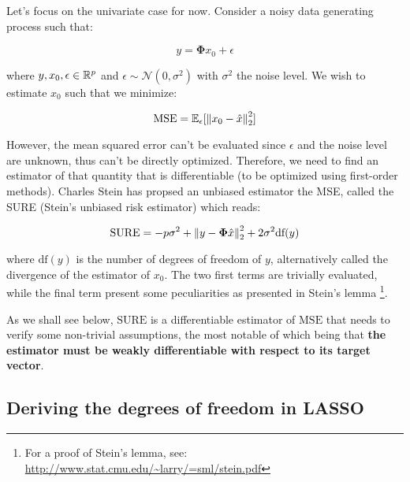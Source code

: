\documentclass[a4paper,10pt]{article}
\theoremstyle{definition}
\begin{document}
Let's focus on the univariate case for now. Consider a noisy data generating process such that:

\begin{equation*}
    y = \mathbf{\Phi}x_0 + \epsilon
\end{equation*}

where $y, x_0, \epsilon \in \mathbb{R}^p$ and $\epsilon \sim \mathcal{N}(0, \sigma^2)$ with
$\sigma^2$ the noise level. We wish to estimate
$x_0$ such that we minimize:

\begin{equation*}
    \text{MSE} = \mathbb{E}_{\epsilon}[ \left \lVert x_0 - \hat{x} \right \rVert_2^2 ]
\end{equation*}

However, the mean squared error can't be evaluated since $\epsilon$ and the noise level
are unknown, thus can't be directly optimized. Therefore, we need to find an estimator of that
quantity that is differentiable (to be optimized using first-order methods). Charles Stein has
propsed an unbiased estimator the MSE, called the SURE (Stein's unbiased risk estimator) which reads:

\begin{equation*}
    \text{SURE} = -p\sigma^2 + \left \lVert y - \mathbf{\Phi} \hat{x} \right \rVert_2^2 + 2 \sigma^2 \text{df}(y)
\end{equation*}

where $\text{df}(y)$ is the number of degrees of freedom of $y$, alternatively called the divergence of
the estimator of $x_0$. The two first terms are trivially evaluated, while the final term present some
peculiarities as presented in Stein's lemma \footnote{For a proof of Stein's lemma, see:
\url{http://www.stat.cmu.edu/~larry/=sml/stein.pdf}}.

As we shall see below, $\text{SURE}$ is a differentiable estimator of $\text{MSE}$ that needs to verify some
non-trivial assumptions, the most notable of which being that \textbf{the estimator must be weakly differentiable with
respect to its target vector}.

\subsection*{Deriving the degrees of freedom in LASSO}

\newpage


\end{document}
